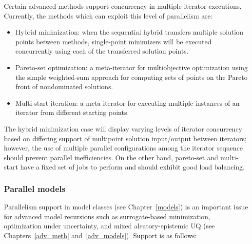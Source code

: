 Certain advanced methods support concurrency in multiple iterator
executions. Currently, the methods which can exploit this level of
parallelism are:

\begin{itemize}
\item Hybrid minimization: when the sequential hybrid transfers multiple
solution points between methods, single-point minimizers will be executed
concurrently using each of the transferred solution points.


\item Pareto-set optimization: a meta-iterator for multiobjective
  optimization using the simple weighted-sum approach for computing
  sets of points on the Pareto front of nondominated solutions.

\item Multi-start iteration: a meta-iterator for executing multiple
  instances of an iterator from different starting points.
\end{itemize}

The hybrid minimization case will display varying levels of iterator 
concurrency based on differing support of multipoint solution input/output 
between iterators; however, the use of multiple parallel configurations 
among the iterator sequence should prevent parallel inefficiencies.  On 
the other hand, pareto-set and multi-start have a fixed set of jobs to 
perform and should exhibit good load balancing.

\subsubsection{Parallel models}\label{parallel:algorithms:models}

Parallelism support in model classes (see Chapter~\ref{models}) is an
important issue for 
advanced model recursions such as surrogate-based minimization,
optimization under uncertainty, and mixed aleatory-epistemic UQ (see
Chapters~\ref{adv_meth} and~\ref{adv_models}).  Support is as follows:

